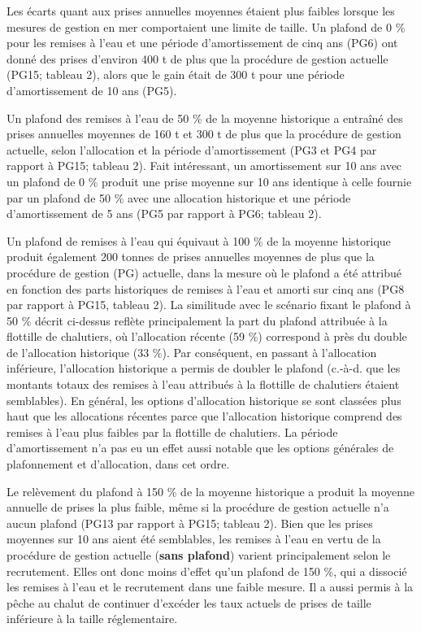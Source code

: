 \documentclass[11pt]{book}
\begin{document}
Les écarts quant aux prises annuelles moyennes étaient plus faibles lorsque les mesures de gestion en mer comportaient une limite de taille. Un plafond de 0 \% pour les remises à l'eau et une période d'amortissement de cinq ans (PG6) ont donné des prises d'environ 400 t de plus que la procédure de gestion actuelle (PG15; tableau 2), alors que le gain était de 300 t pour une période d'amortissement de 10 ans (PG5).

Un plafond des remises à l'eau de 50 \% de la moyenne historique a entraîné des prises annuelles moyennes de 160 t et 300 t de plus que la procédure de gestion actuelle, selon l'allocation et la période d'amortissement (PG3 et PG4 par rapport à PG15; tableau 2). Fait intéressant, un amortissement sur 10 ans avec un plafond de 0 \% produit une prise moyenne sur 10 ans identique à celle fournie par un plafond de 50 \% avec une allocation historique et une période d'amortissement de 5 ans (PG5 par rapport à PG6; tableau 2).

Un plafond de remises à l'eau qui équivaut à 100 \% de la moyenne historique produit également 200 tonnes de prises annuelles moyennes de plus que la procédure de gestion (PG) actuelle, dans la mesure où le plafond a été attribué en fonction des parts historiques de remises à l'eau et amorti sur cinq ans (PG8 par rapport à PG15, tableau 2). La similitude avec le scénario fixant le plafond à 50 \% décrit ci-dessus reflète principalement la part du plafond attribuée à la flottille de chalutiers, où l'allocation récente (59 \%) correspond à près du double de l'allocation historique (33 \%). Par conséquent, en passant à l'allocation inférieure, l'allocation historique a permis de doubler le plafond (c.-à-d. que les montants totaux des remises à l'eau attribués à la flottille de chalutiers étaient semblables). En général, les options d'allocation historique se sont classées plus haut que les allocations récentes parce que l'allocation historique comprend des remises à l'eau plus faibles par la flottille de chalutiers. La période d'amortissement n'a pas eu un effet aussi notable que les options générales de plafonnement et d'allocation, dans cet ordre.

Le relèvement du plafond à 150 \% de la moyenne historique a produit la moyenne annuelle de prises la plus faible, même si la procédure de gestion actuelle n'a aucun plafond (PG13 par rapport à PG15; tableau 2). Bien que les prises moyennes sur 10 ans aient été semblables, les remises à l'eau en vertu de la procédure de gestion actuelle (\textbf{sans plafond}) varient principalement selon le recrutement. Elles ont donc moins d'effet qu'un plafond de 150 \%, qui a dissocié les remises à l'eau et le recrutement dans une faible mesure. Il a aussi permis à la pêche au chalut de continuer d'excéder les taux actuels de prises de taille inférieure à la taille réglementaire.
\end{document}
